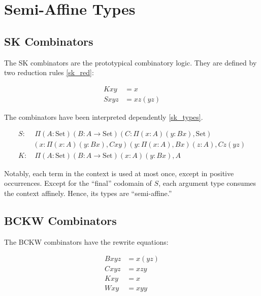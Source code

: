 \documentclass{article}
\newcommand{\set}{\mathrm{Set}}
\begin{document}
\section{Semi-Affine Types}

\subsection{SK Combinators}

The SK combinators are the prototypical combinatory logic. They are defined by two reduction rules \eqref{sk_red}:

\begin{equation}
\begin{split}\label{sk_red}
  K x y &= x \\
  S x y z &= x z (y z)
\end{split}
\end{equation}

The combinators have been interpreted dependently \cite{altenkirch} \eqref{sk_types}.

\begin{equation}
\begin{split}\label{sk_types}
  S :&\ \Pi (A : \set) (B : A \rightarrow \set) (C : \Pi (x : A) (y : B x), \set) \\
    &(x : \Pi (x : A) (y : B x), C x y) (y : \Pi (x : A), B x) (z : A), C z (y z) \\
  K :&\ \Pi (A : \set) (B : A \rightarrow \set) (x : A) (y : B x), A
\end{split}
\end{equation}

Notably, each term in the context is used at most once, except in positive occurrences. Except for the ``final'' codomain of \(S\), each argument type consumes the context affinely. Hence, its types are ``semi-affine.''

\subsection{BCKW Combinators}

The BCKW combinators have the rewrite equations:

\begin{equation}
\begin{split}
  B x y z &= x (y z)\\
  C x y z &= x z y\\
  K x y &= x\\
  W x y &= x y y
\end{split}
\end{equation}
\end{document}
